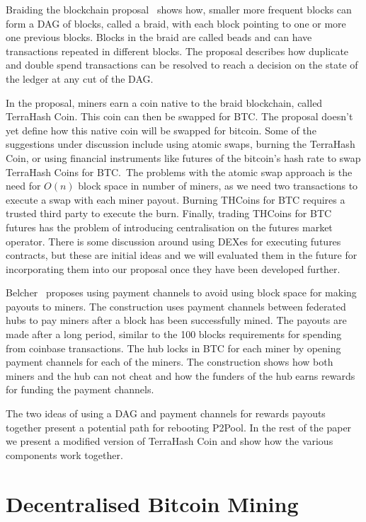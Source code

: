 \documentclass{article}
\begin{document}
Braiding the blockchain proposal~\cite{mcelrath:variance} shows how,
smaller more frequent blocks can form a DAG of blocks, called a braid,
with each block pointing to one or more one previous blocks. Blocks in
the braid are called beads and can have transactions repeated in
different blocks. The proposal describes how duplicate and double
spend transactions can be resolved to reach a decision on the state of
the ledger at any cut of the DAG.\@

In the proposal, miners earn a coin native to the braid blockchain,
called TerraHash Coin. This coin can then be swapped for BTC. The
proposal doesn't yet define how this native coin will be swapped for
bitcoin. Some of the suggestions under discussion include using atomic
swaps, burning the TerraHash Coin, or using financial instruments like
futures of the bitcoin's hash rate to swap TerraHash Coins for BTC.\
The problems with the atomic swap approach is the need for $O(n)$
block space in number of miners, as we need two transactions to
execute a swap with each miner payout. Burning THCoins for BTC
requires a trusted third party to execute the burn. Finally, trading
THCoins for BTC futures has the problem of introducing centralisation
on the futures market operator. There is some discussion around using
DEXes for executing futures contracts, but these are initial ideas and
we will evaluated them in the future for incorporating them into our
proposal once they have been developed further.

Belcher~\cite{channels-for-rewards} proposes using payment channels to
avoid using block space for making payouts to miners. The construction
uses payment channels between federated hubs to pay miners after a
block has been successfully mined. The payouts are made after a long
period, similar to the 100 blocks requirements for spending from
coinbase transactions. The hub locks in BTC for each miner by opening
payment channels for each of the miners. The construction shows how
both miners and the hub can not cheat and how the funders of the hub
earns rewards for funding the payment channels.

The two ideas of using a DAG and payment channels for rewards
payouts together present a potential path for rebooting P2Pool. In the
rest of the paper we present a modified version of TerraHash Coin and
show how the various components work together.

\section{Decentralised Bitcoin Mining}
\end{document}
